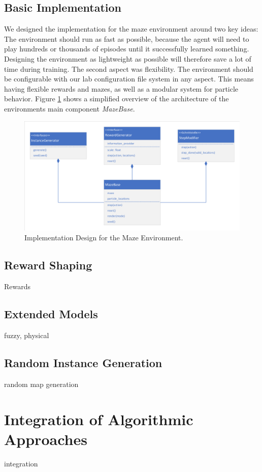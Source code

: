 \subsection{Basic Implementation} \label{sec:MazeImplementation}
We designed the implementation for the maze environment around two key ideas: The environment should run as fast as possible, because the agent will need to play hundreds or thousands of episodes until it successfully learned something. Designing the environment as lightweight as possible will therefore save a lot of time during training. The second aspect was flexibility. The environment should be configurable with our lab configuration file system in any aspect. This means having flexible rewards and mazes, as well as a modular system for particle behavior. Figure \ref{fig:MazeBaseDesign} shows a simplified overview of the architecture of the environments main component \textit{MazeBase}.

\begin{figure}[ht]
    
    \begin{center}
        \includegraphics[clip, trim=10px 10px 10px 10px, width=0.9\columnwidth]{figures/implementation/maze_base_design.pdf}
    \end{center}
    
    \caption[Implementation Design for the Maze Environment]{Implementation Design for the Maze Environment.}
    \label{fig:MazeBaseDesign}
  \end{figure}

\subsection{Reward Shaping} \label{sec:MazeReward}
Rewards

\subsection{Extended Models} \label{sec:ExtendedMaze}
fuzzy, physical 

\subsection{Random Instance Generation} \label{sec:RandomInstanceGeneration}
random map generation

\section{Integration of Algorithmic Approaches} \label{sec:AlgorithmIntegration}
integration


